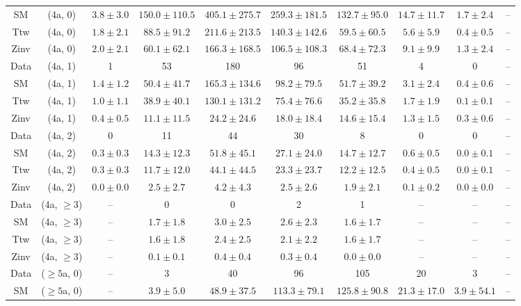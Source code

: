 \begin{table}[h!]
{\begin{tabular}{cccccccccc}
	SM & (4a, 0) & $3.8\pm 3.0$ & $150.0\pm 110.5$ & $405.1\pm 275.7$ & $259.3\pm 181.5$ & $132.7\pm 95.0$ & $14.7\pm 11.7$ & $1.7\pm 2.4$ & -- \\[0.5ex] 
	Ttw & (4a, 0) & $1.8\pm 2.1$ & $88.5\pm 91.2$ & $211.6\pm 213.5$ & $140.3\pm 142.6$ & $59.5\pm 60.5$ & $5.6\pm 5.9$ & $0.4\pm 0.5$ & -- \\[0.5ex] 
	Zinv & (4a, 0) & $2.0\pm 2.1$ & $60.1\pm 62.1$ & $166.3\pm 168.5$ & $106.5\pm 108.3$ & $68.4\pm 72.3$ & $9.1\pm 9.9$ & $1.3\pm 2.4$ & -- \\[0.5ex] 
	Data & (4a, 1) & 1 & 53 & 180 & 96 & 51 & 4 & 0 & -- \\[0.5ex] 
	SM & (4a, 1) & $1.4\pm 1.2$ & $50.4\pm 41.7$ & $165.3\pm 134.6$ & $98.2\pm 79.5$ & $51.7\pm 39.2$ & $3.1\pm 2.4$ & $0.4\pm 0.6$ & -- \\[0.5ex] 
	Ttw & (4a, 1) & $1.0\pm 1.1$ & $38.9\pm 40.1$ & $130.1\pm 131.2$ & $75.4\pm 76.6$ & $35.2\pm 35.8$ & $1.7\pm 1.9$ & $0.1\pm 0.1$ & -- \\[0.5ex] 
	Zinv & (4a, 1) & $0.4\pm 0.5$ & $11.1\pm 11.5$ & $24.2\pm 24.6$ & $18.0\pm 18.4$ & $14.6\pm 15.4$ & $1.3\pm 1.5$ & $0.3\pm 0.6$ & -- \\[0.5ex] 
	Data & (4a, 2) & 0 & 11 & 44 & 30 & 8 & 0 & 0 & -- \\[0.5ex] 
	SM & (4a, 2) & $0.3\pm 0.3$ & $14.3\pm 12.3$ & $51.8\pm 45.1$ & $27.1\pm 24.0$ & $14.7\pm 12.7$ & $0.6\pm 0.5$ & $0.0\pm 0.1$ & -- \\[0.5ex] 
	Ttw & (4a, 2) & $0.3\pm 0.3$ & $11.7\pm 12.0$ & $44.1\pm 44.5$ & $23.3\pm 23.7$ & $12.2\pm 12.5$ & $0.4\pm 0.5$ & $0.0\pm 0.1$ & -- \\[0.5ex] 
	Zinv & (4a, 2) & $0.0\pm 0.0$ & $2.5\pm 2.7$ & $4.2\pm 4.3$ & $2.5\pm 2.6$ & $1.9\pm 2.1$ & $0.1\pm 0.2$ & $0.0\pm 0.0$ & -- \\[0.5ex] 
	Data & (4a, $\ge3$) & -- & 0 & 0 & 2 & 1 & -- & -- & -- \\[0.5ex] 
	SM & (4a, $\ge3$) & -- & $1.7\pm 1.8$ & $3.0\pm 2.5$ & $2.6\pm 2.3$ & $1.6\pm 1.7$ & -- & -- & -- \\[0.5ex] 
	Ttw & (4a, $\ge3$) & -- & $1.6\pm 1.8$ & $2.4\pm 2.5$ & $2.1\pm 2.2$ & $1.6\pm 1.7$ & -- & -- & -- \\[0.5ex] 
	Zinv & (4a, $\ge3$) & -- & $0.1\pm 0.1$ & $0.4\pm 0.4$ & $0.3\pm 0.4$ & $0.0\pm 0.0$ & -- & -- & -- \\[0.5ex] 
	Data & ($\ge5$a, 0) & -- & 3 & 40 & 96 & 105 & 20 & 3 & -- \\[0.5ex] 
	SM & ($\ge5$a, 0) & -- & $3.9\pm 5.0$ & $48.9\pm 37.5$ & $113.3\pm 79.1$ & $125.8\pm 90.8$ & $21.3\pm 17.0$ & $3.9\pm 54.1$ & -- \\[0.5ex] 

\end{tabular}}
\end{table}
